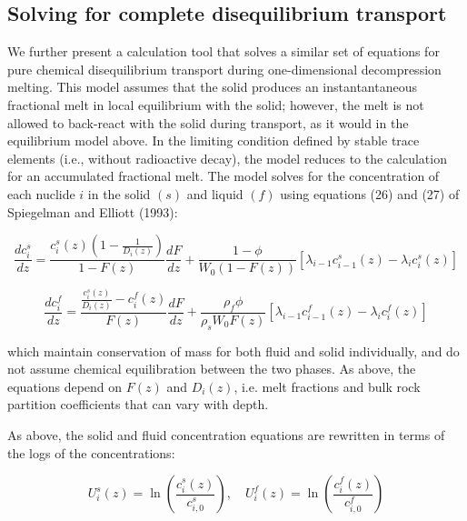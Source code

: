\documentclass[draft]{agujournal2019}
\begin{document}
\subsection{Solving for complete disequilibrium transport}

We further present a calculation tool that solves a similar set of equations for pure chemical disequilibrium  transport during one-dimensional decompression melting. This model assumes that the solid produces an instantantaneous fractional melt in local equilibrium with the solid; however, the melt is not allowed to back-react with the solid during transport, as it would in the equilibrium model above. In the limiting condition defined by stable trace elements (i.e., without radioactive decay), the model reduces to the calculation for an accumulated fractional melt. The model solves for the concentration of each nuclide $i$ in the solid $(s)$ and liquid $(f)$ using equations (26) and (27) of Spiegelman and Elliott (1993):

\begin{linenomath*}
\begin{equation}
    \frac{dc_i^s}{dz} = \frac{c_i^s(z) (1 - \frac{1}{D_i(z)})}{1-F(z)} \frac{dF}{dz} + \frac{1-\phi}{W_0(1-F(z))} [\lambda_{i-1} c_{i-1}^s(z) - \lambda_i c_i^s(z)]\label{eq:21}
\end{equation}
\end{linenomath*}

\begin{linenomath*}
\begin{equation}
    \frac{dc_i^f}{dz} = \frac{\frac{c_i^s(z)}{D_i(z)}-c_i^f(z)}{F(z)} \frac{dF}{dz} + \frac{\rho_f \phi}{\rho_s W_0 F(z)} [\lambda_{i-1} c_{i-1}^f(z) - \lambda_i c_i^f(z)]\label{eq:22}
\end{equation}
\end{linenomath*}

which maintain conservation of mass for both fluid and solid individually, and do not assume chemical equilibration between the two phases. As above, the equations depend on $F(z)$ and $D_i(z)$, i.e. melt fractions and bulk rock partition coefficients that can vary with depth.

As above, the solid and fluid concentration equations are rewritten in terms of the logs of the concentrations:

\begin{linenomath*}
\begin{equation}
    U^s_i(z) = \ln\left(\frac{c_i^{s}(z)}{c_{i,0}^s}\right),  \quad U^f_i(z) = \ln\left(\frac{c_i^{f}(z)}{c_{i,0}^f}\right)\label{eq:23}
\end{equation}
\end{linenomath*}
\end{document}

